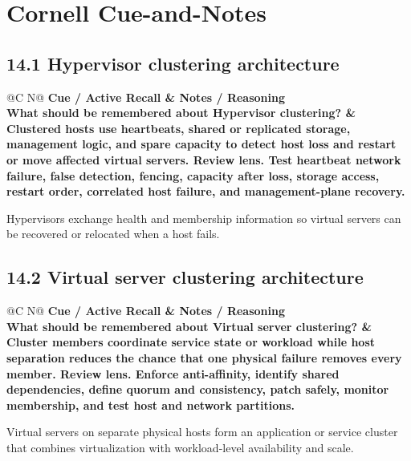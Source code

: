 \documentclass[11pt]{article}
\newcommand{\CornellHeader}{\rowcolor{Navy}\color{white}\bfseries Cue / Active Recall & \color{white}\bfseries Notes / Reasoning \\\endhead}
\newcommand{\CornellRow}[2]{\cellcolor{CueGray}\textbf{#1} & #2 \\\addlinespace[3pt]}
\begin{document}
\section{Cornell Cue-and-Notes}
\subsection{14.1 Hypervisor clustering architecture}
\begin{longtable}{@{}C N@{}}
\CornellHeader
\CornellRow{What should be remembered about Hypervisor clustering?}{Clustered hosts use heartbeats, shared or replicated storage, management logic, and spare capacity to detect host loss and restart or move affected virtual servers. \textbf{Review lens.} Test heartbeat network failure, false detection, fencing, capacity after loss, storage access, restart order, correlated host failure, and management-plane recovery.}
\end{longtable}
\begin{sectionsummarybox}
Hypervisors exchange health and membership information so virtual servers can be recovered or relocated when a host fails.
\end{sectionsummarybox}
\subsection{14.2 Virtual server clustering architecture}
\begin{longtable}{@{}C N@{}}
\CornellHeader
\CornellRow{What should be remembered about Virtual server clustering?}{Cluster members coordinate service state or workload while host separation reduces the chance that one physical failure removes every member. \textbf{Review lens.} Enforce anti-affinity, identify shared dependencies, define quorum and consistency, patch safely, monitor membership, and test host and network partitions.}
\end{longtable}
\begin{sectionsummarybox}
Virtual servers on separate physical hosts form an application or service cluster that combines virtualization with workload-level availability and scale.
\end{sectionsummarybox}
\end{document}
